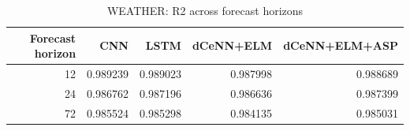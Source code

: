 \begin{table}
\caption{WEATHER: R2 across forecast horizons}
\begin{tabular}{rrrrr}
\toprule
Forecast horizon & CNN & LSTM & dCeNN+ELM & dCeNN+ELM+ASP \\
\midrule
12 & 0.989239 & 0.989023 & 0.987998 & 0.988689 \\
24 & 0.986762 & 0.987196 & 0.986636 & 0.987399 \\
72 & 0.985524 & 0.985298 & 0.984135 & 0.985031 \\
\bottomrule
\end{tabular}
\end{table}
